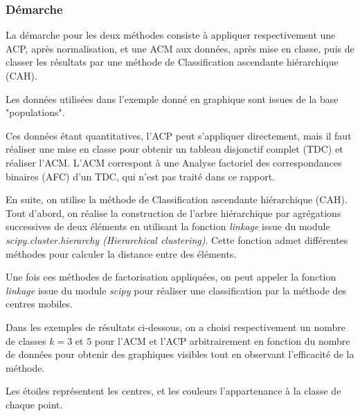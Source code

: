 
\subsubsection{Démarche}

La démarche pour les deux méthodes consiste à appliquer respectivement une ACP, après normalisation, et une ACM aux données, après mise en classe, puis de classer les résultats par une méthode de Classification ascendante hiérarchique (CAH).

Les données utilisées dans l'exemple donné en graphique sont issues de la base "populations".

Ces données étant quantitatives, l'ACP peut s'appliquer directement, mais il faut réaliser une mise en classe pour obtenir un tableau disjonctif complet (TDC) et réaliser l'ACM. L'ACM correspont à une Analyse factoriel des correspondances binaires (AFC) d'un TDC, qui n'est pas traité dans ce rapport.

En suite, on utilise la méthode de Classification ascendante hiérarchique (CAH). Tout d'abord, on réalise la construction de l'arbre hiérarchique par agrégations successives de deux éléments en utilisant la fonction \textit{linkage} issue du module \textit{scipy.cluster.hierarchy (Hierarchical clustering)}. Cette fonction admet différentes méthodes pour calculer la distance entre des éléments.




Une fois ces méthodes de factorisation appliquées, on peut appeler la fonction \textit{linkage} issue du module \textit{scipy} pour réaliser une classification par la méthode des centres mobiles.

Dans les exemples de résultats ci-dessous, on a choisi respectivement un nombre de classes $k = 3$ et $5$ pour l'ACM et l'ACP arbitrairement en fonction du nombre de données pour obtenir des graphiques visibles tout en observant l'efficacité de la méthode.

Les étoiles représentent les centres, et les couleurs l'appartenance à la classe de chaque point.


